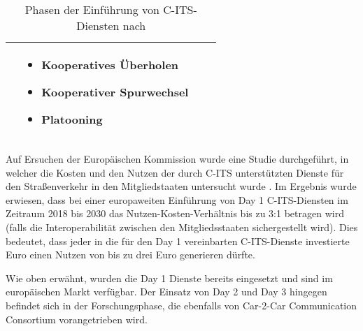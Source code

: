\begin{table}[h!]
\begin{tabular}{|m{4em}|m{10em}|m{10em}|m{8em}|}
\begin{itemize}[leftmargin=0.3cm]
	\end{itemize} & 
	\begin{itemize}[leftmargin=0.3cm] \item Kooperatives Überholen
	
	\item Kooperativer Spurwechsel
	
	\item Platooning
	
	\end{itemize} \\ 
		\hline
	\end{tabular}
	\caption{Phasen der Einführung von C-ITS-Diensten nach \cite{Car2Car}}
	\label{table:1}
\end{table}

Auf Ersuchen der Europäischen Kommission wurde eine Studie durchgeführt, in welcher die Kosten und den Nutzen der durch C-ITS unterstützten Dienste für den Straßenverkehr in den Mitgliedstaaten untersucht wurde \cite{StudyDeployment}. Im Ergebnis wurde erwiesen, dass bei einer europaweiten Einführung von Day 1 C-ITS-Diensten im Zeitraum 2018 bis 2030 das Nutzen-Kosten-Verhältnis bis zu 3:1 betragen wird (falls die Interoperabilität zwischen den Mitgliedsstaaten sichergestellt wird). Dies bedeutet, dass jeder in die für den Day 1 vereinbarten C-ITS-Dienste investierte Euro einen Nutzen von bis zu drei Euro generieren dürfte. 

Wie oben erwähnt, wurden die Day 1 Dienste bereits eingesetzt und sind im europäischen Markt verfügbar. Der Einsatz von Day 2 und Day 3 hingegen befindet sich in der Forschungsphase, die ebenfalls von Car-2-Car Communication Consortium vorangetrieben wird. 



%

